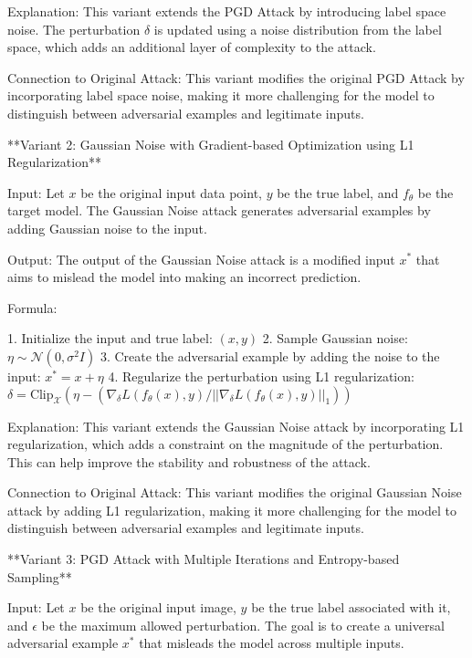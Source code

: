 Explanation: This variant extends the PGD Attack by introducing label space noise. The perturbation $\delta$ is updated using a noise distribution from the label space, which adds an additional layer of complexity to the attack.

Connection to Original Attack: This variant modifies the original PGD Attack by incorporating label space noise, making it more challenging for the model to distinguish between adversarial examples and legitimate inputs.





**Variant 2: Gaussian Noise with Gradient-based Optimization using L1 Regularization**

Input: Let $x$ be the original input data point, $y$ be the true label, and $f_{\theta}$ be the target model. The Gaussian Noise attack generates adversarial examples by adding Gaussian noise to the input.

Output: The output of the Gaussian Noise attack is a modified input $x^*$ that aims to mislead the model into making an incorrect prediction.

Formula:

1. Initialize the input and true label:
   $(x, y)$
2. Sample Gaussian noise:
   $\eta \sim \mathcal{N}(0, \sigma^2 I)$
3. Create the adversarial example by adding the noise to the input:
   $x^* = x + \eta$
4. Regularize the perturbation using L1 regularization:
   $\delta = \text{Clip}_{\mathcal{X}}(\eta - (\nabla_\delta L(f_\theta(x), y) / ||\nabla_\delta L(f_\theta(x), y)||_1))$

Explanation: This variant extends the Gaussian Noise attack by incorporating L1 regularization, which adds a constraint on the magnitude of the perturbation. This can help improve the stability and robustness of the attack.

Connection to Original Attack: This variant modifies the original Gaussian Noise attack by adding L1 regularization, making it more challenging for the model to distinguish between adversarial examples and legitimate inputs.



**Variant 3: PGD Attack with Multiple Iterations and Entropy-based Sampling**

Input: Let $x$ be the original input image, $y$ be the true label associated with it, and $\epsilon$ be the maximum allowed perturbation. The goal is to create a universal adversarial example $x^*$ that misleads the model across multiple inputs.

